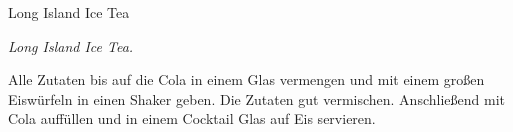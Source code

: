 \begin{recipe}{Long Island Ice Tea}{}{}

  \freeform{}\textit{Long Island Ice Tea.}


  Alle Zutaten bis auf die Cola in einem Glas vermengen und mit einem großen Eiswürfeln in einen Shaker geben.
  Die Zutaten gut vermischen.
  Anschließend mit Cola auffüllen und in einem Cocktail Glas auf Eis servieren.

  \freeform{}\hrulefill{}

\end{recipe}
